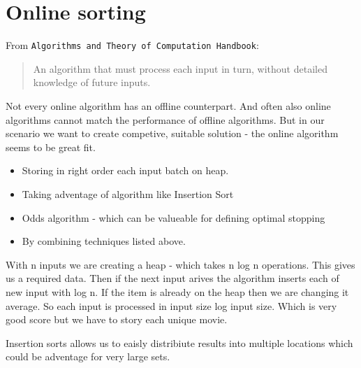 \section*{Online sorting}
From \texttt{Algorithms and Theory of Computation Handbook}:
\begin{quote}
An algorithm that must process each input in turn, without detailed knowledge
of future inputs.
\end{quote}

Not every online algorithm has an offline counterpart. And often also online
algorithms cannot match the performance of offline algorithms.
But in our scenario we want to create competive, suitable solution - the online
algorithm seems to be great fit.

\begin{itemize}
	\item{Storing in right order each input batch on heap.}
	\item{Taking adventage of algorithm like Insertion Sort}
	\item{Odds algorithm - which can be valueable for defining optimal stopping}
  \item{By combining techniques listed above. }
\end{itemize}

With n inputs we are creating a heap - which takes n log n operations. This gives
us a required data. Then if the next input arives the algorithm inserts each
of new input with log n. If the item is already on the heap then we are changing
it average. So each input is processed in input size log input size.
Which is very good score but we have to story each unique movie.

Insertion sorts allows us to eaisly distribiute results into multiple locations
which could be adventage for very large sets.    
